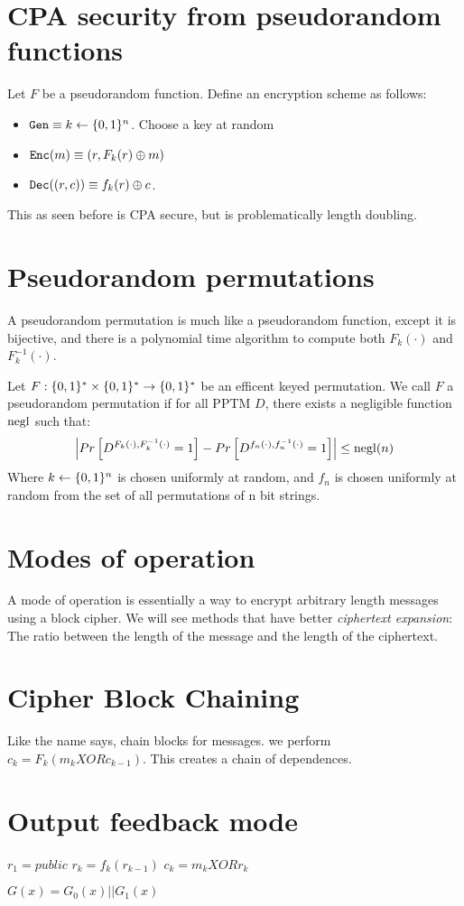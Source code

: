 \section{CPA security from pseudorandom functions}
Let $F$ be a pseudorandom function. Define an encryption scheme as follows:
\begin{itemize}
\item $\texttt{Gen} \equiv k \leftarrow \{0, 1\}^n$. Choose a key at random
\item $\texttt{Enc}(m) \equiv ( r, F_k(r) \oplus m)$
\item $\texttt{Dec}((r, c)) \equiv f_k(r) \oplus c$.
\end{itemize}

This as seen before is CPA secure, but is problematically length doubling.

\section{Pseudorandom permutations}
A pseudorandom permutation is much like a pseudorandom function, except it
is bijective, and there is a polynomial time algorithm to compute both
$F_k(\cdot)$ and $F_k^{-1}(\cdot)$.

\begin{definition}
    Let $F: \{0, 1\}^* \times \{0, 1\}^* \rightarrow \{0, 1\}^*$ be an efficent
    keyed permutation. We call $F$ a pseudorandom permutation if for all
    PPTM $D$, there exists a negligible function $\operatorname{negl}$ such that:
    \begin{align*}
        \left| Pr\left[ D^{F_k(\cdot), F_k^{-1}(\cdot)} = 1 \right] - 
        Pr\left[ D^{f_n(\cdot), f_n^{-1}(\cdot)} = 1 \right] \right| \leq \operatorname{negl}(n)
    \end{align*}
    Where $k \leftarrow \{0, 1\}^n$ is chosen uniformly at random, and $f_n$
    is chosen uniformly at random from the set of all permutations of n
    bit strings.
\end{definition}

\section{Modes of operation}
A mode of operation is essentially a way to encrypt arbitrary length
messages using a block cipher. We will see methods that have better
\emph{ciphertext expansion}: The ratio between  the length of the message
and the length of the ciphertext.

\section{Cipher Block Chaining}

Like the name says, chain blocks for messages. we perform $c_k = F_k(m_k XOR
c_{k - 1})$. This creates a chain of dependences.

\section{Output feedback mode} $r_1 = public$ $r_k = f_k(r_{k - 1})$ $c_k = m_k
XOR r_k$


$G(x) = G_0(x) || G_1(x)$



